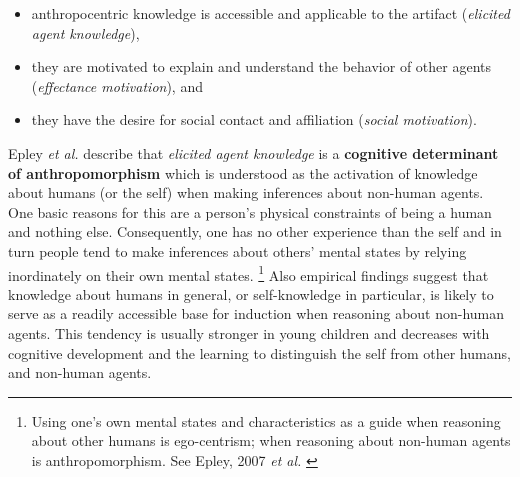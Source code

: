 \documentclass[twocolumn]{svjour3}          %
\begin{document}
\begin{itemize}
	\item anthropocentric knowledge is accessible and applicable to the artifact (\textit{elicited agent knowledge}),
	\item they are motivated to explain and understand the behavior of other agents (\textit{effectance motivation}), and
	\item they have the desire for social contact and affiliation (\textit{social motivation}).
\end{itemize}

	Epley \textit{et al.} describe that \textit{elicited agent knowledge} is a \textbf{cognitive determinant  of anthropomorphism} which is understood as the activation of knowledge about humans (or the self) when making inferences about non-human agents. One basic reasons for this are a person's physical constraints of being a human and nothing else. Consequently, one has no other experience than the self and in turn people tend to make inferences about others' mental states by relying inordinately on their own mental states. \footnote{Using one's own mental states and characteristics as a guide when reasoning about other humans is ego-centrism; when reasoning about non-human agents is anthropomorphism. See Epley, 2007 \textit{et al.} \cite{epley_seeing_2007}} Also empirical findings suggest that knowledge about humans in general, or self-knowledge in particular, is likely to serve as a readily accessible base for induction when reasoning about non-human agents. This tendency is usually stronger in young children and decreases with cognitive development and the learning to distinguish the self from other humans, and non-human agents. 
	
\end{document}
